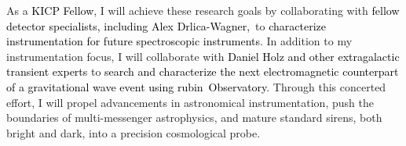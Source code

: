 \documentclass[11pt]{article}
\newcommand{\tcolor}{black}
\newcommand{\Rubin}{\ac{rubin}}
\newcommand{\Position}{\textcolor{\tcolor}{KICP Fellow}}
\begin{document}






% 


As a \Position, I will achieve these research goals by collaborating with \textcolor{\tcolor}{fellow detector specialists, including Alex Drlica-Wagner,}\ to \textcolor{\tcolor}{characterize instrumentation for future spectroscopic instruments}. In addition to my instrumentation focus, I will collaborate with \textcolor{\tcolor}{Daniel Holz and other extragalactic transient experts} to \textcolor{\tcolor}{search and characterize the next electromagnetic counterpart of a gravitational wave event using \Rubin\ Observatory}.
Through this concerted effort, I will propel advancements in astronomical instrumentation, push the boundaries of multi-messenger astrophysics, and mature standard sirens, both bright and dark, into a precision cosmological probe.

\end{document}
